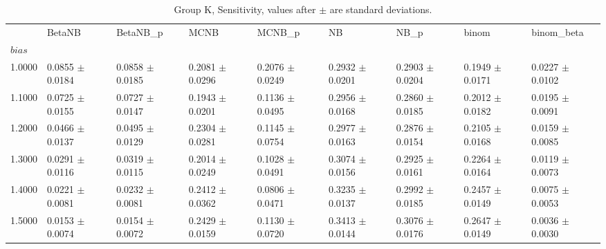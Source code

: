 \begin{table}[H]
\centering
\begin{adjustbox}{max width=\linewidth}
\begin{tabular}{lllllllll}
\toprule
 & BetaNB & BetaNB\_p & MCNB & MCNB\_p & NB & NB\_p & binom & binom\_beta \\
$bias$ &  &  &  &  &  &  &  &  \\
\midrule
1.0000 & 0.0855 $\pm$ 0.0184 & 0.0858 $\pm$ 0.0185 & 0.2081 $\pm$ 0.0296 & 0.2076 $\pm$ 0.0249 & 0.2932 $\pm$ 0.0201 & 0.2903 $\pm$ 0.0204 & 0.1949 $\pm$ 0.0171 & 0.0227 $\pm$ 0.0102 \\
1.1000 & 0.0725 $\pm$ 0.0155 & 0.0727 $\pm$ 0.0147 & 0.1943 $\pm$ 0.0201 & 0.1136 $\pm$ 0.0495 & 0.2956 $\pm$ 0.0168 & 0.2860 $\pm$ 0.0185 & 0.2012 $\pm$ 0.0182 & 0.0195 $\pm$ 0.0091 \\
1.2000 & 0.0466 $\pm$ 0.0137 & 0.0495 $\pm$ 0.0129 & 0.2304 $\pm$ 0.0281 & 0.1145 $\pm$ 0.0754 & 0.2977 $\pm$ 0.0163 & 0.2876 $\pm$ 0.0154 & 0.2105 $\pm$ 0.0168 & 0.0159 $\pm$ 0.0085 \\
1.3000 & 0.0291 $\pm$ 0.0116 & 0.0319 $\pm$ 0.0115 & 0.2014 $\pm$ 0.0249 & 0.1028 $\pm$ 0.0491 & 0.3074 $\pm$ 0.0156 & 0.2925 $\pm$ 0.0161 & 0.2264 $\pm$ 0.0164 & 0.0119 $\pm$ 0.0073 \\
1.4000 & 0.0221 $\pm$ 0.0081 & 0.0232 $\pm$ 0.0081 & 0.2412 $\pm$ 0.0362 & 0.0806 $\pm$ 0.0471 & 0.3235 $\pm$ 0.0137 & 0.2992 $\pm$ 0.0185 & 0.2457 $\pm$ 0.0149 & 0.0075 $\pm$ 0.0053 \\
1.5000 & 0.0153 $\pm$ 0.0074 & 0.0154 $\pm$ 0.0072 & 0.2429 $\pm$ 0.0159 & 0.1130 $\pm$ 0.0720 & 0.3413 $\pm$ 0.0144 & 0.3076 $\pm$ 0.0176 & 0.2647 $\pm$ 0.0149 & 0.0036 $\pm$ 0.0030 \\
\bottomrule
\end{tabular}

\end{adjustbox}
\caption{Group K, Sensitivity, values after $\pm$ are standard deviations.}
\end{table}

